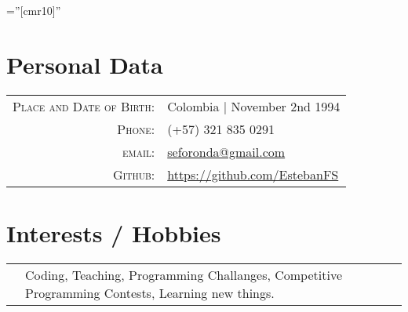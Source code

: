 \documentclass[a4paper,10pt]{article} %
\begin{document}
\pagestyle{empty} %

\font\fb=''[cmr10]'' %


\par{\bigskip\par} %

\section{Personal Data}

\begin{tabular}{rl}
\textsc{Place and Date of Birth:} & Colombia | November 2nd 1994\\
\textsc{Phone:} & (+57) 321 835 0291\\
\textsc{email:} & \href{mailto:seforonda@gmail.com}{seforonda@gmail.com}\\
\textsc{Github:} & \href{https://github.com/EstebanFS}{https://github.com/EstebanFS}
\end{tabular}



\section{Interests / Hobbies}
\begin{tabular}{r|p{11cm}}
& \footnotesize{Coding, Teaching, Programming Challanges, Competitive Programming Contests, Learning new things.}
\end{tabular}

\end{document}
